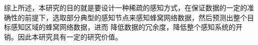 \documentclass[UTF8]{ctexart}
\begin{document}
综上所述，本研究的目的就是要设计一种稀疏的感知方式，在保证数据的一定的准确性的前提下，选取部分典型的感知节点来感知蜂窝网络数据，然后预测出整个目标感知区域的蜂窝网络数据，进而
降低数据的冗余度，降低整个感知系统的开销。因此本研究具有一定的研究价值。%



\end{document}
